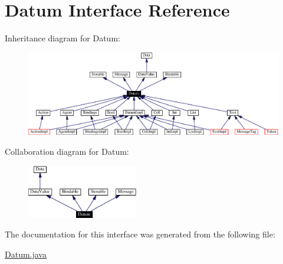 \hypertarget{interfaceDatum}{
\section{Datum  Interface Reference}
\label{interfaceDatum}
}
Inheritance diagram for Datum:\begin{figure}[H]
\begin{center}
\leavevmode
\includegraphics[width=344pt]{interfaceDatum__inherit__graph}
\end{center}
\end{figure}
Collaboration diagram for Datum:\begin{figure}[H]
\begin{center}
\leavevmode
\includegraphics[width=137pt]{interfaceDatum__coll__graph}
\end{center}
\end{figure}


The documentation for this interface was generated from the following file:\begin{CompactItemize}
\item 
\hyperlink{Datum_8java-source}{Datum.java}\end{CompactItemize}
